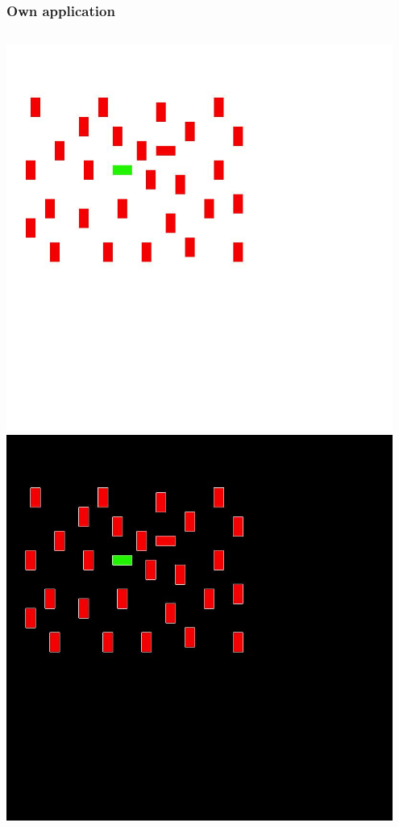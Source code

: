 \documentclass{beamer}
\begin{document}
\begin{frame}
    \frametitle{Own application}
    \begin{columns}
            \centering
            \includegraphics[width=0.95\textwidth]{report-images/vst-04.jpg}
            \centering
            \includegraphics[width=0.95\textwidth]{report-images/thresh_vst-04.jpg}
    \end{columns}
\end{frame}
\end{document}
